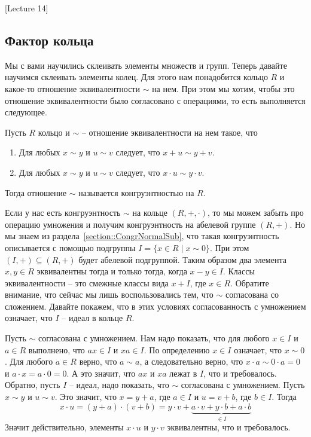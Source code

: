 [Lecture 14]


\subsection{Фактор кольца}

Мы с вами научились склеивать элементы множеств и групп.
Теперь давайте научимся склеивать элементы колец.
Для этого нам понадобится кольцо $R$ и какое-то отношение эквивалентности $\sim$ на нем.
При этом мы хотим, чтобы это отношение эквивалентности было согласовано с операциями, то есть выполняется следующее.

\begin{definition}
Пусть $R$ кольцо и $\sim$ -- отношение эквивалентности на нем такое, что
\begin{enumerate}
\item Для любых $x\sim y$ и $u \sim v$ следует, что $x + u \sim y + v$.

\item Для любых $x\sim y$ и $u\sim v$ следует, что $x \cdot u \sim y \cdot v$.
\end{enumerate}
Тогда отношение $\sim$ называется конгруэнтностью на $R$.
\end{definition}

Если у нас есть конгруэнтность $\sim$ на кольце $(R, +, \cdot)$, то мы можем забыть про операцию умножения и получим конгруэнтность на абелевой группе $(R, +)$.
Но мы знаем из раздела~\ref{section::CongrNormalSub}, что такая конгруэнтность описывается с помощью подгруппы $I = \{ x\in R \mid x \sim 0\}$.
При этом $(I, +) \subseteq (R, +)$ будет абелевой подгруппой.
Таким образом два элемента $x,y\in R$ эквивалентны тогда и только тогда, когда $x - y \in I$.
Классы эквивалентности -- это смежные классы вида $x + I$, где $x\in R$.
Обратите внимание, что сейчас мы лишь воспользовались тем, что $\sim$ согласована со сложением.
Давайте покажем, что в этих условиях согласованность с умножением означает, что $I$ -- идеал в кольце $R$.

Пусть $\sim$ согласована с умножением.
Нам надо показать, что для любого $x\in I$ и $a\in R$ выполнено, что $ax\in I$ и $xa\in I$.
По определению $x\in I$ означает, что $x\sim 0$.
Для любого $a\in R$ верно, что $a\sim a$, а следовательно верно, что $x \cdot a \sim 0 \cdot a = 0$ и $a \cdot x = a \cdot 0  = 0$.
А это значит, что $ax$ и $xa$ лежат в $I$, что и требовалось.
Обратно, пусть $I$ -- идеал, надо показать, что $\sim$ согласована с умножением.
Пусть $x\sim y$ и $u\sim v$.
Это значит, что $x = y + a$, где $a\in I$ и $u = v + b$, где $b \in I$.
Тогда
\[
x\cdot u = (y + a) \cdot ( v + b) = y \cdot v + \underbrace{a \cdot v + y \cdot b + a \cdot b}_{\in I}
\]
Значит действительно, элементы $x\cdot u $ и $y\cdot v$ эквивалентны, что и требовалось.

